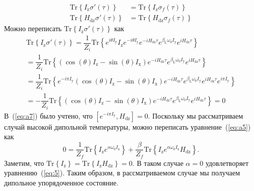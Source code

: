 \documentclass[utf8]{jetp}
\newcommand{\tr}[1]{\mathrm{Tr} \left\{ #1 \right\}}
\newcommand{\sx}{I_\mathrm{x}}
\newcommand{\sy}{I_\mathrm{y}}
\newcommand{\sz}{I_\mathrm{z}}
\newcommand{\hdz}{H_\mathrm{dz}}
\begin{document}
\begin{align}
  \label{eq:a5}
  \mathrm{Tr} \left\{ I_\mathrm{z} \sigma'(\tau) \right\}
  & = \mathrm{Tr} \left\{ I_\mathrm{z} \sigma_{f}(\tau) \right\}
  \\
  \label{eq:a6}
  \mathrm{Tr} \left\{ H_\mathrm{dz} \sigma'(\tau) \right\}
  & = \mathrm{Tr} \left\{ H_\mathrm{dz} \sigma_{f}(\tau) \right\}
\end{align}
%
Можно переписать $\mathrm{Tr} \left\{ I_\mathrm{z} \sigma'(\tau) \right\}$ как
%
\begin{multline}
  \label{eq:a7}
  \tr{I_\mathrm{z} \sigma'(\tau)}
  = \dfrac{1}{Z_{i}} \tr{
    e^{i \theta \sy} \sz e^{-i \theta \sy}
    e^{-i \hdz \tau} e^{\beta_\mathrm{L} \omega_{0} \sy} e^{i \hdz \tau}
  }
  \\
  = \dfrac{1}{Z_i} \tr{
    \left( \cos(\theta) \sz - \sin(\theta) \sx \right)
    e^{-i \hdz \tau} e^{\beta_\mathrm{L} \omega_{0} \sy} e^{i \hdz \tau}
  }
  \\
  = \dfrac{1}{Z_i} \tr{
    e^{-i \pi \sy}
    \left( \cos(\theta) \sz - \sin(\theta) \sx \right)
    e^{-i \hdz \tau} e^{\beta_\mathrm{L} \omega_{0} \sy} e^{i \hdz \tau}
    e^{i \pi \sy}
  }
  \\
  = - \dfrac{1}{Z_i} \tr{
    \left( \cos(\theta) \sz - \sin(\theta) \sx \right)
    e^{-i \hdz \tau} e^{\beta_\mathrm{L} \omega_{0} \sy} e^{i \hdz \tau}
  } = 0
\end{multline}
%
В~(\ref{eq:a7}) было учтено, что $\left[ e^{-i \pi \sy}, \hdz \right] = 0$.
Поскольку мы рассматриваем случай высокой дипольной температуры, можно переписать уравнение~(\ref{eq:a5}) как
\begin{equation}
  \label{eq:a8}
  0 = \dfrac{1}{Z_f} \tr{ \sz e^{\alpha \omega_0 \sz}}
  + \dfrac{\beta}{Z_f} \tr{\sz e^{\alpha \omega_0 \sz} \hdz}.
\end{equation}
%
Заметим, что $\tr{\sz} = \tr{\sz\hdz} = 0$.
В таком случае $\alpha = 0$ удовлетворяет уравнению~(\ref{eq:5}).
Таким образом, в рассматриваемом случае мы получаем дипольное упорядоченное состояние.


\end{document}
